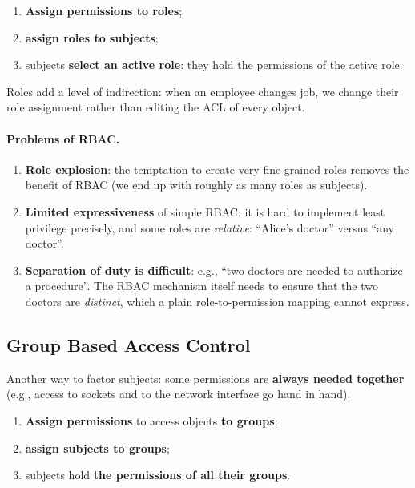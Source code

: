 \begin{definition}
\begin{enumerate}
    \item \textbf{Assign permissions to roles};
    \item \textbf{assign roles to subjects};
    \item subjects \textbf{select an active role}: they hold the permissions of the active role.
\end{enumerate}
\end{definition}

Roles add a level of indirection: when an employee changes job, we change their role assignment rather than editing the ACL of every object.

\vspace{-5pt}
\paragraph{Problems of RBAC.}
\begin{enumerate}
    \item \textbf{Role explosion}: the temptation to create very fine-grained roles removes the benefit of RBAC (we end up with roughly as many roles as subjects).
    \item \textbf{Limited expressiveness} of simple RBAC: it is hard to implement least privilege precisely, and some roles are \emph{relative}: ``Alice's doctor'' versus ``any doctor''.
    \item \textbf{Separation of duty is difficult}: e.g., ``two doctors are needed to authorize a procedure''. The RBAC mechanism itself needs to ensure that the two doctors are \emph{distinct}, which a plain role-to-permission mapping cannot express.
\end{enumerate}

\subsection{Group Based Access Control}

Another way to factor subjects: some permissions are \textbf{always needed together} (e.g., access to sockets and to the network interface go hand in hand).

\begin{definition}
\begin{enumerate}
    \item \textbf{Assign permissions} to access objects \textbf{to groups};
    \item \textbf{assign subjects to groups};
    \item subjects hold \textbf{the permissions of all their groups}.
\end{enumerate}
\end{definition}

